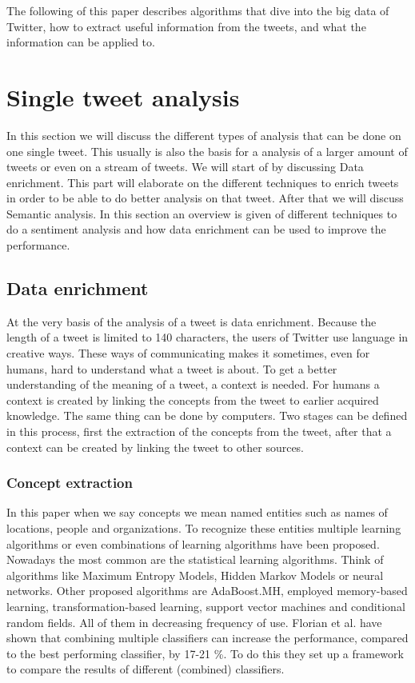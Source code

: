 \documentclass{article}
\begin{document}
The following of this paper describes algorithms that dive into the big data of Twitter, how to extract useful information from the tweets, and what the information can be applied to.


\section{Single tweet analysis}
In this section we will discuss the different types of analysis that can be done on one single tweet. This usually is also the basis for a analysis of a larger amount of tweets or even on a stream of tweets. We will start of by discussing Data enrichment. This part will elaborate on the different techniques to enrich tweets in order to be able to do better analysis on that tweet. After that we will discuss Semantic analysis. In this section an overview is given of different techniques to do a sentiment analysis and how data enrichment can be used to improve the performance.
\subsection{Data enrichment}
At the very basis of the analysis of a tweet is data enrichment. Because the length of a tweet is limited to 140 characters, the users of Twitter use language in creative ways. These ways of communicating makes it sometimes, even for humans, hard to understand what a tweet is about. To get a better understanding of the meaning of a tweet, a context is needed. For humans a context is created by linking the concepts from the tweet to earlier acquired knowledge. The same thing can be done by computers. Two stages can be defined in this process, first the extraction of the concepts from the tweet, after that a context can be created by linking the tweet to other sources.
\subsubsection{Concept extraction}
In this paper when we say concepts we mean named entities such as names of locations, people and organizations. To recognize these entities multiple learning algorithms or even combinations of learning algorithms have been proposed. Nowadays the most common are the statistical learning algorithms. Think of algorithms like Maximum Entropy Models, Hidden Markov Models or neural networks. Other proposed algorithms are AdaBoost.MH, employed memory-based learning, transformation-based learning, support vector machines and conditional random fields. All of them in decreasing frequency of use.\cite{EntityRecognition} Florian et al. have shown that combining multiple classifiers can increase the performance, compared to the best performing classifier, by 17-21 \%.\cite{ClassifierCombination} To do this they set up a framework to compare the results of different (combined) classifiers.  
\end{document}
